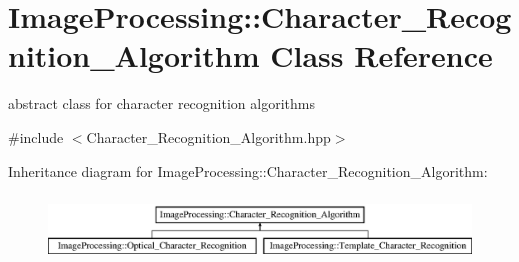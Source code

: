 \hypertarget{class_image_processing_1_1_character___recognition___algorithm}{}\section{Image\+Processing\+:\+:Character\+\_\+\+Recognition\+\_\+\+Algorithm Class Reference}
\label{class_image_processing_1_1_character___recognition___algorithm}


abstract class for character recognition algorithms  




{\ttfamily \#include $<$Character\+\_\+\+Recognition\+\_\+\+Algorithm.\+hpp$>$}

Inheritance diagram for Image\+Processing\+:\+:Character\+\_\+\+Recognition\+\_\+\+Algorithm\+:\begin{figure}[H]
\begin{center}
\leavevmode
\includegraphics[height=1.794872cm]{class_image_processing_1_1_character___recognition___algorithm}
\end{center}
\end{figure}
